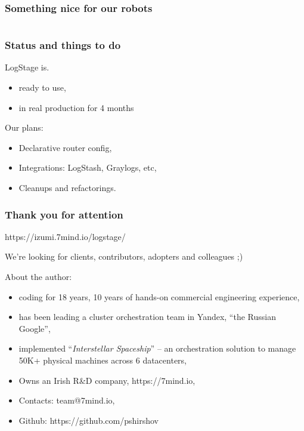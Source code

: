 \documentclass[usenames,dvipsnames]{beamer}
\begin{document}
\begin{frame}
\frametitle{Something nice for our robots}
\begin{figure}
    \inputminted[fontsize=\scriptsize]{json}{target/ex-json-out.tmp}
\end{figure}
\end{frame}

\begin{frame}
\frametitle{Status and things to do}
LogStage is.
\begin{itemize}
\item ready to use,
\item in real production for 4 months
\end{itemize}
\vspace{0.3cm}
Our plans:
\begin{itemize}
\item Declarative router config,
\item Integrations: LogStash, Graylogs, etc,
\item Cleanups and refactorings.
\end{itemize}
\end{frame}

\begin{frame}
    \frametitle{Thank you for attention}

    \begin{center}
      https://izumi.7mind.io/logstage/

      We're looking for clients, contributors, adopters and colleagues ;)
    \end{center}

    About the author:
    \begin{itemize}
        \item coding for 18 years, 10 years of hands-on commercial engineering experience,
        \item has been leading a cluster orchestration team in Yandex, ``the Russian Google'',
        \item implemented ``\textit{Interstellar Spaceship}'' -- an orchestration solution to manage 50K+ physical machines across 6 datacenters,
        \item Owns an Irish R\&D company, https://7mind.io,
        \item Contacts: team@7mind.io,
        \item Github: https://github.com/pshirshov
    \end{itemize}
\end{frame}
\end{document}
